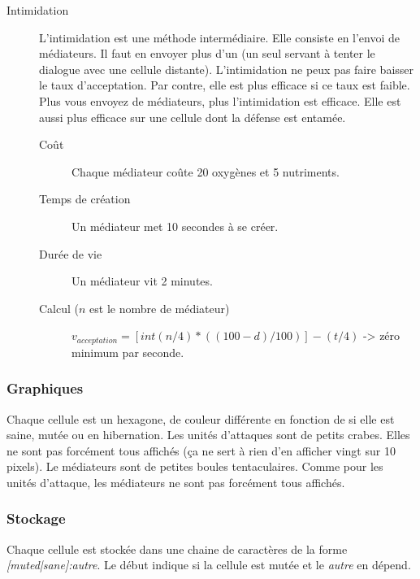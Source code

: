 \documentclass{article}
\begin{document}
\begin{description}
	\item[Intimidation]\label{intimi}
		L'intimidation est une méthode intermédiaire. Elle consiste en l'envoi de médiateurs. Il faut en envoyer plus d'un (un seul servant à tenter le dialogue avec une cellule distante). L'intimidation ne peux pas faire baisser le taux d'acceptation. Par contre, elle est plus efficace si ce taux est faible. Plus vous envoyez de médiateurs, plus l'intimidation est efficace. Elle est aussi plus efficace sur une cellule dont la défense est entamée.
		\begin{description}
			\item[Coût] Chaque médiateur coûte 20 oxygènes et 5 nutriments.
			\item[Temps de création] Un médiateur met 10 secondes à se créer.
			\item[Durée de vie] Un médiateur vit 2 minutes.
			\item[Calcul ($n$ est le nombre de médiateur)] $v_{acceptation} = [int(n/4) * ((100-d) / 100)] - (t/4)$ -> zéro minimum par seconde.
		\end{description}
\end{description}

\subsubsection{Graphiques}
Chaque cellule est un hexagone, de couleur différente en fonction de si elle est saine, mutée ou en hibernation. Les unités d'attaques sont de petits crabes. Elles ne sont pas forcément tous affichés (ça ne sert à rien d'en afficher vingt sur 10 pixels). Le médiateurs sont de petites boules tentaculaires. Comme pour les unités d'attaque, les médiateurs ne sont pas forcément tous affichés.

\subsubsection{Stockage}
Chaque cellule est stockée dans une chaine de caractères de la forme \emph{[muted|sane]:autre}. Le début indique si la cellule est mutée et le \emph{autre} en dépend. %
\end{document}

